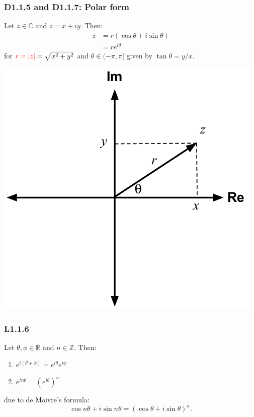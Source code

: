 \documentclass{article}
\begin{document}
\begin{multicols*}{3}
\subsubsection*{D1.1.5 and D1.1.7: Polar form}
Let $z\in\mathbb{C}$ and $z=x+iy$. Then:
\begin{align*}
    z
    &=r(\cos\theta+i\sin\theta) \\
    &=re^{i\theta}
\end{align*}
for $\textcolor{red}{r=|z|}=\sqrt{x^2+y^2}$ and
$\theta\in(-\pi,\pi]$ given by $\tan\theta=y/x$.
\begin{center}
    \includegraphics[scale=0.2]{f0.png}
\end{center}

\subsubsection*{L1.1.6}
Let $\theta,\phi\in\mathbb{R}$ and $n\in\mathbb{Z}$. Then:
\begin{enumerate}
    \item $e^{i(\theta+\phi)}=e^{i\theta}e^{i\phi}$
    
    \item $e^{in\theta}=(e^{i\theta})^n$
\end{enumerate}
due to de Moivre's formula:
$$\cos n\theta+i\sin n\theta=(\cos \theta+i\sin \theta)^n.$$


\end{multicols*}
\end{document}
